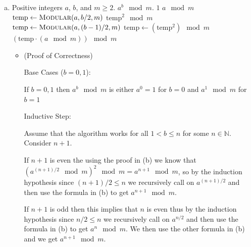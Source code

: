 \documentclass[12pt, letterpaper]{article}
\theoremstyle{definition}
\newcommand{\N}{\mathbb{N}}
\begin{document}
\begin{enumerate}[(a)]
    \item \begin{algorithm}[H]
        \caption{Fast Modular Exponentiation}
        \label{fast-mod-exp}
        \begin{algorithmic}[1]
        \Require Positive integers \( a \), \( b \), and \( m \geq 2 \).
        \Ensure \( a^b \mod m \).
            \State \Return \( 1 \) 
        \EndIf
            \State \Return \( a \mod m \) 
        \EndIf
            \State \( \text{temp} \gets \Call{Modular}{a, b/2, m} \) 
            \State \Return \( \text{temp}^2 \mod m \) 
        \EndIf
        \State \( \text{temp} \gets \Call{Modular}{a, (b-1)/2, m} \) 
        \State \( \text{temp} \gets (\text{temp}^2) \mod m \) 
        \State \Return \( (\text{temp} \cdot (a \mod m)) \mod m \) 
        \EndIf
        \EndFunction
        \end{algorithmic}
        \end{algorithm}

    \begin{itemize}
        \item (Proof of Correctness)
        
        Base Cases ($b=0,1$):
        
        If $b=0,1$ then $a^b \mod m$ is either $a^0=1$ for $b=0$ and $a^1 \mod m$ for $b=1$

        Inductive Step:

        Assume that the algorithm works for all $1<b  \leq n$ for some $n \in \N$. Consider $n+1$.

        If $n+1$ is even the using the proof in (b) we know that $(a^{(n+1)/2} \mod m)^2 \mod m = a^{n+1} \mod m$, so by the induction hypothesis since $(n+1)/2 \leq n$ we recursively call on $a^{(n+1)/2}$ and then use the formula in (b) to get $a^{n+1} \mod m$.

        If $n+1$ is odd then this implies that $n$ is even thus by the induction hypothesis since $n/2 \leq n$ we recursively call on $a^{n/2}$ and then use the formula in (b) to get $a^n \mod m$. We then use the other formula in (b) and we get $a^{n+1} \mod m$.


\end{itemize}
\end{enumerate}
\end{document}
